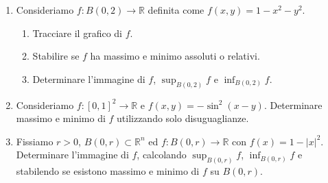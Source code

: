 \begin{enumerate}
	\item Consideriamo $f: B(0,2) \to \mathbb{R}$ definita come $f(x,y) = 1 - x^2 - y^2$.
	\begin{enumerate}
		\item Tracciare il grafico di $f$.
		\item Stabilire se $f$ ha massimo e minimo assoluti o relativi.
		\item Determinare l'immagine di $f$, $\sup_{B(0,2)} f$ e $\inf_{B(0,2)} f$.
	\end{enumerate}
	
	\item Consideriamo $f: [0,1]^2 \to \mathbb{R}$ e $f(x,y) = -\sin^2(x-y)$. Determinare massimo e minimo di $f$ utilizzando solo disuguaglianze.
	
	\item Fissiamo $r > 0$, $B(0,r) \subset \mathbb{R}^n$ ed $f: B(0,r) \to \mathbb{R}$ con $f(x) = 1 - |x|^2$. Determinare l'immagine di $f$, calcolando $\sup_{B(0,r)} f$, $\inf_{B(0,r)} f$ e stabilendo se esistono massimo e minimo di $f$ su $B(0,r)$.
\end{enumerate}